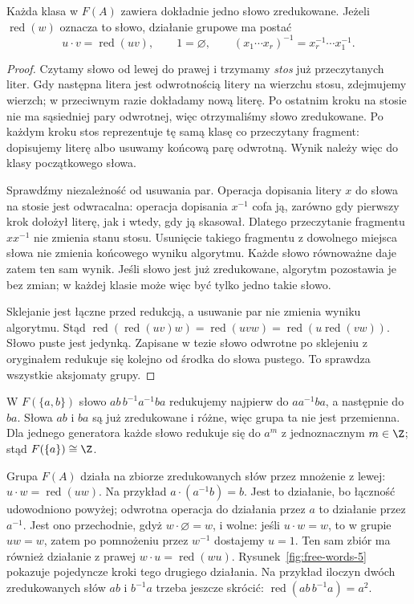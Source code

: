 \begin{stwierdzenie}
\label{prop:free-reduction-5}
Każda klasa w $F(A)$ zawiera dokładnie jedno
słowo zredukowane. Jeżeli $\operatorname{red}(w)$
oznacza to słowo, działanie grupowe ma postać
\[
 u\cdot v=\operatorname{red}(uv),\qquad
 1=\varnothing,\qquad
 (x_1\cdots x_r)^{-1}=x_r^{-1}\cdots x_1^{-1}.
\]
\end{stwierdzenie}
\begin{proof}
Czytamy słowo od lewej do prawej i trzymamy
\emph{stos} już przeczytanych liter.
Gdy następna litera jest odwrotnością
litery na wierzchu stosu, zdejmujemy wierzch;
w przeciwnym razie dokładamy nową literę.
Po ostatnim kroku na stosie nie ma sąsiedniej
pary odwrotnej, więc otrzymaliśmy słowo
zredukowane. Po każdym kroku stos reprezentuje tę samą
klasę co przeczytany fragment: dopisujemy literę albo
usuwamy końcową parę odwrotną. Wynik należy więc do klasy
początkowego słowa.

Sprawdźmy niezależność od usuwania par.
Operacja dopisania litery $x$ do słowa
na stosie jest odwracalna: operacja
dopisania $x^{-1}$ cofa ją, zarówno gdy
pierwszy krok dołożył literę, jak i wtedy,
gdy ją skasował. Dlatego przeczytanie
fragmentu $xx^{-1}$ nie zmienia stanu stosu.
Usunięcie takiego fragmentu z dowolnego miejsca
słowa nie zmienia końcowego wyniku algorytmu.
Każde słowo równoważne daje zatem ten sam wynik.
Jeśli słowo jest już zredukowane, algorytm
pozostawia je bez zmian; w każdej klasie
może więc być tylko jedno takie słowo.

Sklejanie jest łączne przed redukcją, a
usuwanie par nie zmienia wyniku algorytmu.
Stąd $\operatorname{red}(\operatorname{red}(uv)w)
=\operatorname{red}(uvw)
=\operatorname{red}(u\operatorname{red}(vw))$.
Słowo puste jest jedynką. Zapisane w tezie
słowo odwrotne po sklejeniu z oryginałem
redukuje się kolejno od środka do słowa pustego.
To sprawdza wszystkie aksjomaty grupy.
\end{proof}

\begin{przyklad}
\label{prz:redukcja-slow-5}
W $F(\{a,b\})$ słowo
$ab\,b^{-1}a^{-1}ba$
redukujemy najpierw do
$aa^{-1}ba$, a następnie
do $ba$. Słowa $ab$ i $ba$
są już zredukowane i różne,
więc grupa ta nie jest przemienna.
Dla jednego generatora każde słowo
redukuje się do $a^m$ z jednoznacznym
$m\in\Z$; stąd $F(\{a\})\cong\Z$.

Grupa $F(A)$ działa na zbiorze zredukowanych
słów przez mnożenie z lewej:
$u\cdot w=\operatorname{red}(uw)$.
Na przykład $a\cdot(a^{-1}b)=b$.
Jest to działanie, bo łączność udowodniono
powyżej; odwrotna operacja do działania
przez $a$ to działanie przez $a^{-1}$.
Jest ono przechodnie, gdyż $w\cdot\varnothing=w$,
i wolne: jeśli $u\cdot w=w$, to w grupie
$uw=w$, zatem po pomnożeniu przez $w^{-1}$
dostajemy $u=1$. Ten sam zbiór ma również
działanie z prawej $w\cdot u=\operatorname{red}(wu)$.
Rysunek~\ref{fig:free-words-5} pokazuje
pojedyncze kroki tego drugiego działania.
Na przykład iloczyn dwóch zredukowanych słów
$ab$ i $b^{-1}a$ trzeba jeszcze skrócić:
$\operatorname{red}(ab\,b^{-1}a)=a^2$.
\end{przyklad}

